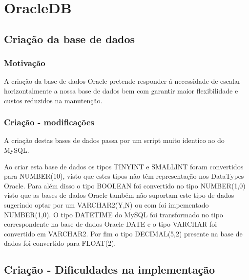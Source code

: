 \section{OracleDB}

\subsection{Criação da base de dados}

\subsubsection{Motivação}

\par A criação da base de dados Oracle pretende responder á necessidade de escalar horizontalmente a nossa base de dados bem com garantir maior flexibilidade e custos reduzidos na manutenção.

\subsubsection{Criação - modificações}

\par A criação destas bases de dados passa por um script muito identico ao do MySQL.\newline
\par Ao criar esta base de dados os tipos TINYINT e SMALLINT foram convertidos para NUMBER(10), visto que estes tipos não têm representação nos DataTypes Oracle. Para além disso o tipo BOOLEAN foi convertido no tipo NUMBER(1,0) visto que as bases de dados Oracle também não suportam este tipo de dados sugerindo optar por um VARCHAR2(Y,N) ou com foi impementado NUMBER(1,0). O tipo DATETIME do MySQL foi transformado no tipo correspondente na base de dados Oracle DATE e o tipo VARCHAR foi convertido em VARCHAR2. Por fim o tipo DECIMAL(5,2) presente na base de dados foi convertido para FLOAT(2).

\subsection{Criação - Dificuldades na implementação}

